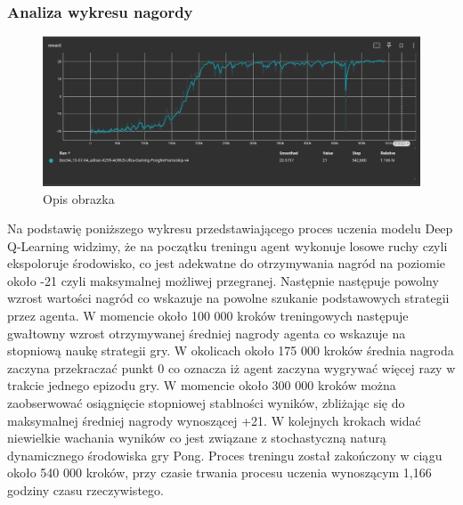\documentclass[a4paper, 12pt]{article}
\numberwithin{equation}{section}
\begin{document}
    \subsubsection{Analiza wykresu nagordy}
    \begin{figure}[htbp]
        \centering
        \includegraphics[width=\textwidth]{pictures/DQL_reward.png}
        \caption{Opis obrazka}
        \label{fig:etykieta_obrazka}
    \end{figure}
    Na podstawię poniższego wykresu przedstawiającego proces uczenia modelu Deep Q-Learning widzimy, że na początku treningu agent wykonuje
    losowe ruchy czyli ekspoloruje środowisko, co jest adekwatne do otrzymywania nagród na poziomie około -21 czyli maksymalnej możliwej przegranej. 
    Następnie następuje powolny wzrost wartości nagród co wskazuje na powolne szukanie podstawowych strategii przez agenta. W momencie około 100 000 
    kroków treningowych następuje gwałtowny wzrost otrzymywanej średniej nagrody agenta co wskazuje na stopniową naukę strategii gry.
    W okolicach około 175 000 kroków średnia nagroda zaczyna przekraczać punkt 0 co oznacza iż agent zaczyna wygrywać więcej razy w trakcie jednego epizodu gry.
    W momencie około 300 000 kroków można zaobserwować osiągnięcie stopniowej stablności wyników, zbliżając się do maksymalnej średniej nagrody wynoszącej +21.
    W kolejnych krokach widać niewielkie wachania wyników co jest związane z stochastyczną naturą dynamicznego środowiska gry Pong.
    Proces treningu został zakończony w ciągu około 540 000 kroków, przy czasie trwania procesu uczenia wynoszącym 1,166 godziny czasu rzeczywistego.
\end{document}
